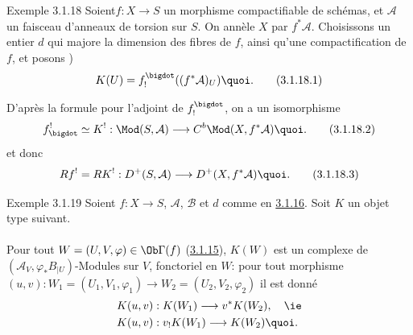 \begin{enonce*}[remark]{Exemple 3.1.18}
Soient\pageoriginale $f:X\rightarrow S$ un morphisme compactifiable de
schémas, et $\mathcal{A}$ un faisceau d'anneaux de torsion sur $S$. On
annèle $X$ par $f^{\ast}\mathcal{A}$. Choisissons un entier $d$ qui
majore la dimension des fibres de $f$, ainsi qu'une compactification
de $f$, et posons )
\begin{equation*}
K(U)=f^{\bigdot}_{!}((f^{\ast}\mathcal{A})_{U}){\quoi}.\tag{3.1.18.1}
\end{equation*}
\end{enonce*}

D'après la formule  pour l'adjoint de $f^{\bigdot}_{!}$, on a
un isomorphisme
\begin{equation*}
f^{!}_{\bigdot}\simeq K^{!}:\Mod(S,\mathcal{A})\longrightarrow C^{b}\Mod(X,f^{\ast}\mathcal{A}){\quoi}.\tag{3.1.18.2}
\end{equation*}%
et donc
\begin{equation*}
Rf^{!}=RK^{!}:D^{+}(S,\mathcal{A})\longrightarrow
D^{+}(X,f^{\ast}\mathcal{A}){\quoi}.\tag{3.1.18.3}
\end{equation*}

\begin{enonce*}[remark]{Exemple 3.1.19}
Soient $f:X\rightarrow S$, $\mathcal{A}$, $\mathcal{B}$ et $d$ comme
en \hyperref[XVIII.subsubsec3.1.16]{3.1.16}. Soit $K$ un objet 
type suivant.
\end{enonce*}

\setcounter{subsubsection}{19}
\setcounter{paragraph}{0}
\paragraph{}
Pour tout $W=(U,V,\varphi)\in \Ob \Gamma(f)$
(\hyperref[XVIII.subsubsec3.1.15]{3.1.15}), $K(W)$ est un 
complexe de $(\mathcal{A}_{V},\varphi_{\ast}B_{|U})$-Modules sur $V$,
fonctoriel en $W$: pour tout morphisme $(u,v):
W_{1}=(U_{1},V_{1},\varphi_{1})\to W_{2}=(U_{2},V_{2},\varphi_{2})$ il
est donné
\begin{align*}
K(u,v) &: K(W_{1})\longrightarrow v^{\ast}K(W_{2}),\quad\mbox{\ie}\\
K(u,v) &: v_{!}K(W_{1})\longrightarrow K(W_{2}){\quoi}.
\end{align*}

